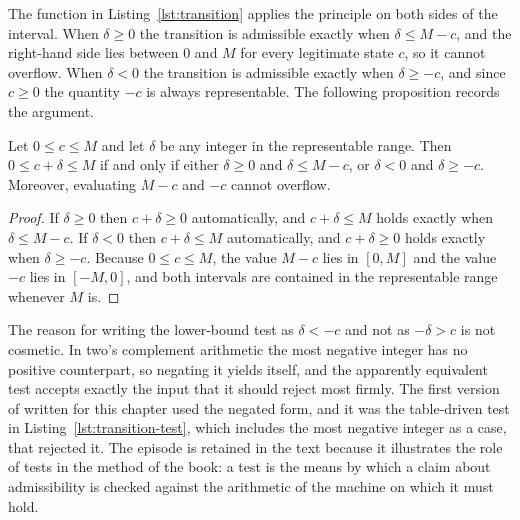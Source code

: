 
The function  in Listing~\ref{lst:transition} applies the principle on both sides of the interval. When $\delta \ge 0$ the transition is admissible exactly when $\delta \le M - c$, and the right-hand side lies between $0$ and $M$ for every legitimate state $c$, so it cannot overflow. When $\delta < 0$ the transition is admissible exactly when $\delta \ge -c$, and since $c \ge 0$ the quantity $-c$ is always representable. The following proposition records the argument.

\begin{proposition}\label{prop:add}
Let $0 \le c \le M$ and let $\delta$ be any integer in the representable range. Then $0 \le c+\delta \le M$ if and only if either $\delta \ge 0$ and $\delta \le M-c$, or $\delta < 0$ and $\delta \ge -c$. Moreover, evaluating $M-c$ and $-c$ cannot overflow.
\end{proposition}

\begin{proof}
If $\delta \ge 0$ then $c+\delta \ge 0$ automatically, and $c+\delta \le M$ holds exactly when $\delta \le M-c$. If $\delta < 0$ then $c+\delta \le M$ automatically, and $c+\delta \ge 0$ holds exactly when $\delta \ge -c$. Because $0 \le c \le M$, the value $M-c$ lies in $[0,M]$ and the value $-c$ lies in $[-M,0]$, and both intervals are contained in the representable range whenever $M$ is.
\end{proof}

The reason for writing the lower-bound test as $\delta < -c$ and not as $-\delta > c$ is not cosmetic. In two's complement arithmetic the most negative integer has no positive counterpart, so negating it yields itself, and the apparently equivalent test accepts exactly the input that it should reject most firmly. The first version of  written for this chapter used the negated form, and it was the table-driven test in Listing~\ref{lst:transition-test}, which includes the most negative integer as a case, that rejected it. The episode is retained in the text because it illustrates the role of tests in the method of the book: a test is the means by which a claim about admissibility is checked against the arithmetic of the machine on which it must hold.


